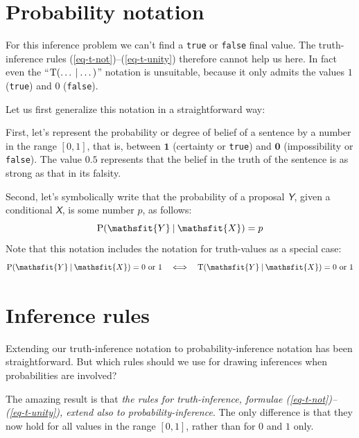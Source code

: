 \documentclass[
  a4paper,
  DIV=11,
  numbers=noendperiod,
  oneside]{scrreprt}
\begin{document}
\hypertarget{probability-notation}{%
\section{Probability notation}\label{probability-notation}}

For this inference problem we can't find a \texttt{true} or
\texttt{false} final value. The truth-inference rules
(\ref{eq-t-not})--(\ref{eq-t-unity}) therefore cannot help us here. In
fact even the
{``\(\mathrm{T}(\dotso \nonscript\:\vert\nonscript\:\mathopen{} \dotso)\)''}
notation is unsuitable, because it only admits the values \(1\)
(\texttt{true}) and \(0\) (\texttt{false}).

Let us first generalize this notation in a straightforward way:

First, let's represent the probability or degree of belief of a sentence
by a number in the range {\([0,1]\),} that is, between \(\mathbf{1}\)
(certainty or \texttt{true}) and \(\mathbf{0}\) (impossibility or
\texttt{false}). The value \(0.5\) represents that the belief in the
truth of the sentence is as strong as that in its falsity.

Second, let's symbolically write that the probability of a proposal
\(\mathsfit{Y}\), given a conditional \(\mathsfit{X}\), is some number
\(p\), as follows: \[
\mathrm{P}(\mathsfit{Y}\nonscript\:\vert\nonscript\:\mathopen{} \mathsfit{X}) = p
\] Note that this notation includes the notation for truth-values as a
special case: \[
\mathrm{P}(\mathsfit{Y}\nonscript\:\vert\nonscript\:\mathopen{} \mathsfit{X}) = 0\text{ or }1
\quad\Longleftrightarrow\quad
\mathrm{T}(\mathsfit{Y}\nonscript\:\vert\nonscript\:\mathopen{} \mathsfit{X}) = 0\text{ or }1
\]

\hypertarget{inference-rules}{%
\section{Inference rules}\label{inference-rules}}

Extending our truth-inference notation to probability-inference notation
has been straightforward. But which rules should we use for drawing
inferences when probabilities are involved?

The amazing result is that \emph{the rules for truth-inference, formulae
(\ref{eq-t-not})--(\ref{eq-t-unity}), extend also to
probability-inference}. The only difference is that they now hold for
all values in the range \([0,1]\), rather than for \(0\) and \(1\) only.
\end{document}

